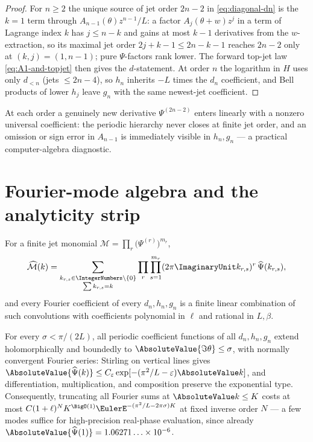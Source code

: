 \documentclass[11pt,oneside]{article}
\numberwithin{equation}{section}
\theoremstyle{definition}
\theoremstyle{remark}
\newcommand{\eps}{\varepsilon}
\newcommand{\Psihat}{\widehat\Psi}
\begin{document}
\begin{proof}
For $n\ge2$ the unique source of jet order $2n-2$ in
\eqref{eq:diagonal-dn} is the $k=1$ term through
$A_{n-1}(\theta)z^{n-1}/L$: a factor $A_j(\theta+w)z^{j}$ in a term
of Lagrange index $k$ has $j\le n-k$ and gains at most $k-1$
derivatives from the $w$-extraction, so its maximal jet order
$2j+k-1\le2n-k-1$ reaches $2n-2$ only at $(k,j)=(1,n-1)$; pure
$\Psi$-factors rank lower.  The forward top-jet law
\eqref{eq:A1-and-topjet} then gives the $d$-statement.  At order $n$
the logarithm in $H$ uses only $d_{<n}$ (jets $\le2n-4$), so
$h_n$ inherits $-L$ times the $d_n$ coefficient, and Bell products of
lower $h_j$ leave $g_n$ with the same newest-jet coefficient.
\end{proof}

At each order a genuinely new derivative $\Psi^{(2n-2)}$ enters
linearly with a nonzero universal coefficient: the periodic hierarchy
never closes at finite jet order, and an omission or sign error in
$A_{n-1}$ is immediately visible in $h_n,g_n$ --- a practical
computer-algebra diagnostic.

\section{Fourier-mode algebra and the analyticity strip}
\label{sec:fourier}

\begin{proposition}
\label{prop:convolutions}
For a finite jet monomial
$\mathcal M=\prod_{r}\bigl(\Psi^{(r)}\bigr)^{m_r}$,
\begin{equation}
 \widehat{\mathcal M}(k)
 =\sum_{\substack{k_{r,s}\in\IntegerNumbers\setminus\{0\}\\ \sum k_{r,s}=k}}
 \prod_{r}\prod_{s=1}^{m_r}
 (2\pi\ImaginaryUnit k_{r,s})^{r}\,\Psihat(k_{r,s}),
 \label{eq:convolution}
\end{equation}
and every Fourier coefficient of every $d_n,h_n,g_n$ is a finite
linear combination of such convolutions with coefficients polynomial
in $\ell$ and rational in $L,\beta$.
\end{proposition}

\begin{proposition}
\label{prop:strip}
For every $\sigma<\pi/(2L)$, all periodic coefficient functions of
all $d_n,h_n,g_n$ extend holomorphically and boundedly to
$\AbsoluteValue{\Im\theta}\le\sigma$, with normally convergent Fourier series:
Stirling on vertical lines gives
$\AbsoluteValue{\Psihat(k)}\le C_\eps\exp[-(\pi^{2}/L-\eps)\AbsoluteValue k]$, and
differentiation, multiplication, and composition preserve the
exponential type.  Consequently, truncating all Fourier sums at
$\AbsoluteValue k\le K$ costs at most
$C(1+\ell)^{N}K^{\BigO(1)}
\EulerE^{-(\pi^{2}/L-2\pi\sigma)K}$ at fixed inverse order $N$ --- a few
modes suffice for high-precision real-phase evaluation, since already
$\AbsoluteValue{\Psihat(1)}=1.06271\ldots\times10^{-6}$.
\end{proposition}
\end{document}
